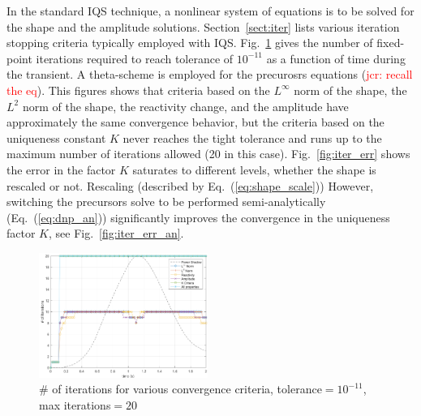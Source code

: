 \documentclass{elsarticle}
\newcommand{\eqt}[1]{Eq.~(\ref{#1})}                     %
\newcommand{\fig}[1]{Fig.~\ref{#1}}                      %
\newcommand{\sct}[1]{Section~\ref{#1}}                   %
\newcommand{\jcr}[1]{\textcolor{red}{jcr: #1}}
\begin{document}
In the standard IQS technique, a nonlinear system of equations is to be solved for the shape and the amplitude solutions. \sct{sect:iter} lists various iteration stopping criteria typically employed with IQS.
\fig{fig:iter} gives the number of fixed-point iterations required to reach tolerance of $10^{-11}$ as a function of time during the transient. A theta-scheme is employed for the precurosrs equations (\jcr{recall the eq}).
This figures shows that criteria based on the  $L^{\infty}$ norm of the shape, the $L^2$ norm of the shape, the reactivity change, and the amplitude have approximately the same convergence behavior, but the criteria 
based on the uniqueness constant $K$ never reaches the tight tolerance and runs up to the maximum number of iterations allowed (20 in this case). 
\fig{fig:iter_err} shows the error in the factor $K$ saturates to different levels, whether the shape is rescaled or not. Rescaling (described by \eqt{eq:shape_scale}) 
However, switching the precursors solve to be performed semi-analytically (\eqt{eq:dnp_an}) significantly improves the convergence in the uniqueness factor $K$, see \fig{fig:iter_err_an}.

\begin{figure}[!htbp]
\centering
\includegraphics[width=0.49\textwidth]{figures/iter_renorm.png}
\caption{\# of iterations for various convergence criteria, tolerance$=10^{-11}$, max iterations$=20$}
\label{fig:iter}
\end{figure}
\end{document}
